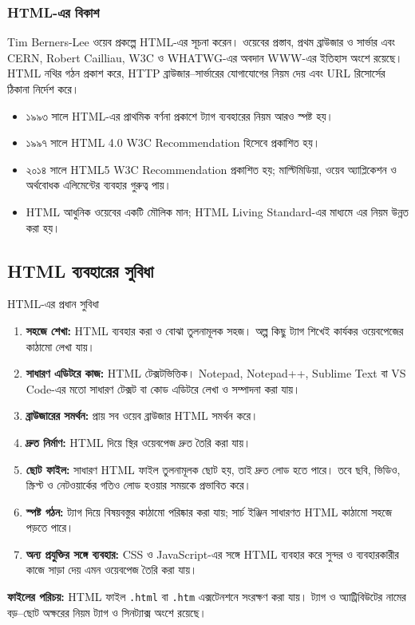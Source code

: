 



\subsubsection{HTML-এর বিকাশ}
Tim Berners-Lee ওয়েব প্রকল্পে HTML-এর সূচনা করেন। ওয়েবের প্রস্তাব, প্রথম ব্রাউজার ও সার্ভার এবং CERN, Robert Cailliau, W3C ও WHATWG-এর অবদান WWW-এর ইতিহাস অংশে রয়েছে। HTML নথির গঠন প্রকাশ করে, HTTP ব্রাউজার–সার্ভারের যোগাযোগের নিয়ম দেয় এবং URL রিসোর্সের ঠিকানা নির্দেশ করে।
\begin{itemize}
\item ১৯৯৩ সালে HTML-এর প্রাথমিক বর্ণনা প্রকাশে ট্যাগ ব্যবহারের নিয়ম আরও স্পষ্ট হয়।
\item ১৯৯৭ সালে HTML 4.0 W3C Recommendation হিসেবে প্রকাশিত হয়।
\item ২০১৪ সালে HTML5 W3C Recommendation প্রকাশিত হয়; মাল্টিমিডিয়া, ওয়েব অ্যাপ্লিকেশন ও অর্থবোধক এলিমেন্টের ব্যবহার গুরুত্ব পায়।
\item HTML আধুনিক ওয়েবের একটি মৌলিক মান; HTML Living Standard-এর মাধ্যমে এর নিয়ম উন্নত করা হয়।
\end{itemize}

\subsection{HTML ব্যবহারের সুবিধা}

\begin{keypointbox}{HTML-এর প্রধান সুবিধা}
\begin{enumerate}
\item \textbf{সহজে শেখা:} HTML ব্যবহার করা ও বোঝা তুলনামূলক সহজ। অল্প কিছু ট্যাগ শিখেই কার্যকর ওয়েবপেজের কাঠামো লেখা যায়।
\item \textbf{সাধারণ এডিটরে কাজ:} HTML টেক্সটভিত্তিক। Notepad, Notepad++, Sublime Text বা VS Code-এর মতো সাধারণ টেক্সট বা কোড এডিটরে লেখা ও সম্পাদনা করা যায়।
\item \textbf{ব্রাউজারের সমর্থন:} প্রায় সব ওয়েব ব্রাউজার HTML সমর্থন করে।
\item \textbf{দ্রুত নির্মাণ:} HTML দিয়ে স্থির ওয়েবপেজ দ্রুত তৈরি করা যায়।
\item \textbf{ছোট ফাইল:} সাধারণ HTML ফাইল তুলনামূলক ছোট হয়, তাই দ্রুত লোড হতে পারে। তবে ছবি, ভিডিও, স্ক্রিপ্ট ও নেটওয়ার্কের গতিও লোড হওয়ার সময়কে প্রভাবিত করে।
\item \textbf{স্পষ্ট গঠন:} ট্যাগ দিয়ে বিষয়বস্তুর কাঠামো পরিষ্কার করা যায়; সার্চ ইঞ্জিন সাধারণত HTML কাঠামো সহজে পড়তে পারে।
\item \textbf{অন্য প্রযুক্তির সঙ্গে ব্যবহার:} CSS ও JavaScript-এর সঙ্গে HTML ব্যবহার করে সুন্দর ও ব্যবহারকারীর কাজে সাড়া দেয় এমন ওয়েবপেজ তৈরি করা যায়।
\end{enumerate}
\end{keypointbox}
\textbf{ফাইলের পরিচয়:} HTML ফাইল \texttt{.html} বা \texttt{.htm} এক্সটেনশনে সংরক্ষণ করা যায়। ট্যাগ ও অ্যাট্রিবিউটের নামের বড়–ছোট অক্ষরের নিয়ম ট্যাগ ও সিনট্যাক্স অংশে রয়েছে।



